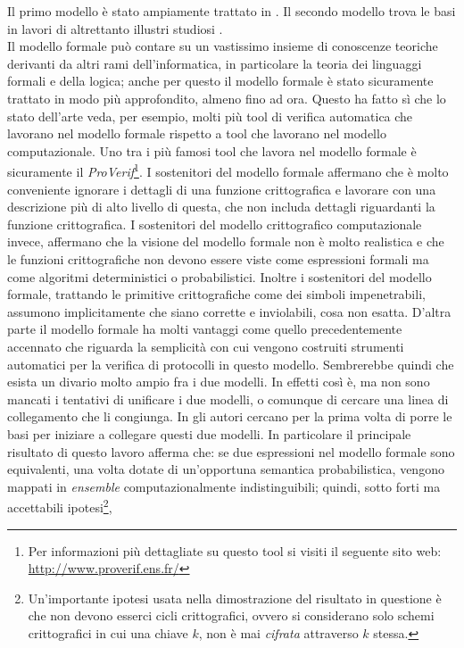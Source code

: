 \documentclass[a4paper,openright,twoside,12pt]{report}
\begin{document}
Il primo modello \`e stato ampiamente trattato in \cite{AbadiG99, BurrowsAN90, Kemmerer87, Paulson98}. 
Il secondo modello trova le basi in lavori di altrettanto illustri studiosi \cite{?}.\\
Il modello formale pu\`o contare su un vastissimo insieme di conoscenze teoriche derivanti da altri rami dell'informatica, in particolare la teoria dei linguaggi formali e della logica;
anche per questo il modello formale \`e stato sicuramente trattato in modo pi\`u approfondito, almeno fino ad ora. Questo ha fatto s\`i che lo stato dell'arte veda, per esempio, molti pi\`u tool di
verifica automatica che lavorano nel modello formale rispetto a tool che lavorano nel modello computazionale. 
Uno tra i pi\`u famosi tool che lavora nel modello formale \`e sicuramente il \emph{ProVerif}\footnote{Per informazioni pi\`u dettagliate su questo tool si visiti il seguente sito web: 
\url{http://www.proverif.ens.fr/}}.
I sostenitori del modello formale affermano che \`e molto conveniente ignorare i dettagli di una funzione crittografica e lavorare con una descrizione 
pi\`u di alto livello di questa, che non includa dettagli riguardanti la funzione crittografica. I sostenitori del modello crittografico computazionale invece, affermano che la visione
del modello formale non \`e molto realistica e che le funzioni crittografiche non devono essere viste come espressioni formali ma come algoritmi deterministici o probabilistici. Inoltre i
sostenitori del modello formale, trattando le primitive crittografiche come dei simboli impenetrabili, assumono implicitamente che siano corrette e inviolabili, cosa non esatta. D'altra parte il modello 
formale ha molti vantaggi come quello precedentemente accennato che riguarda la semplicit\`a con cui vengono costruiti strumenti automatici per la verifica di protocolli in questo modello.
Sembrerebbe quindi che esista un divario molto ampio fra i due modelli. In effetti cos\`i \`e, ma non sono mancati i tentativi di unificare i due modelli, o comunque di cercare una linea
di collegamento che li congiunga.
In \cite{DBLP:journals/joc/AbadiR07} gli autori cercano per la prima volta di porre le basi per iniziare a collegare questi due modelli.
In particolare il principale risultato di questo lavoro afferma che: se due espressioni nel modello formale sono equivalenti, una volta dotate di un'opportuna semantica probabilistica,
vengono mappati in \emph{ensemble} computazionalmente indistinguibili; quindi, sotto forti ma accettabili ipotesi\footnote{Un'importante ipotesi usata nella dimostrazione del risultato in questione
\`e che non devono esserci cicli crittografici, ovvero si considerano solo schemi crittografici in cui una chiave $k$, non \`e mai \emph{cifrata} attraverso $k$ stessa.}, 
\end{document}
